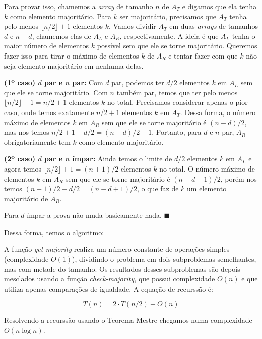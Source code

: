 \documentclass[12pt, a4paper]{article}
\begin{document}
Para provar isso, chamemos a \textit{array} de tamanho $n$ de $A_T$ e digamos que ela tenha $k$ como elemento majoritário. Para $k$ ser majoritário, precisamos que $A_T$ tenha pelo menos $\lfloor n/2 \rfloor + 1$ elementos $k$. Vamos dividir $A_T$ em duas \textit{arrays} de tamanhos $d$ e $n-d$, chamemos elas de $A_L$ e $A_R$, respectivamente. A ideia é que $A_L$ tenha o maior número de elementos $k$ possível sem que ele se torne majoritário. Queremos fazer isso para tirar o máximo de elementos $k$ de $A_R$ e tentar fazer com que $k$ não seja elemento majoritário em nenhuma delas.

\textbf{(1º caso) $d$ par e $n$ par:} Com $d$ par, podemos ter $d/2$ elementos $k$ em $A_L$ sem que ele se torne majoritário. Com $n$ também par, temos que ter pelo menos $\lfloor n/2 \rfloor + 1 = n/2 + 1$ elementos $k$ no total. Precisamos considerar apenas o pior caso, onde temos exatamente $n/2 + 1$ elementos $k$ em $A_T$. Dessa forma, o número máximo de elementos $k$ em $A_R$ sem que ele se torne majoritário é $(n-d)/2$, mas nos temos $n/2 + 1 - d/2=(n-d)/2 + 1$. Portanto, para $d$ e $n$ par, $A_R$ obrigatoriamente tem $k$ como elemento majoritário.

\textbf{(2º caso) $d$ par e $n$ ímpar:} Ainda temos o limite de $d/2$ elementos $k$ em $A_L$ e agora temos $\lfloor n/2 \rfloor + 1 = (n+1)/2$ elementos $k$ no total. O número máximo de elementos $k$ em $A_R$ sem que ele se torne majoritário é $(n-d-1)/2$, porém nos temos $(n+1)/2 - d/2 = (n-d+1)/2$, o que faz de $k$ um elemento majoritário de $A_R$.

Para $d$ ímpar a prova não muda basicamente nada. $\blacksquare$

Dessa forma, temos o algoritmo:



A função \textit{get-majority} realiza um número constante de operações simples (complexidade $O(1)$), dividindo o problema em dois subproblemas semelhantes, mas com metade do tamanho. Os resultados desses subproblemas são depois mesclados usando a função \textit{check-majority}, que possui complexidade $O(n)$ e que utiliza apenas comparações de igualdade. A equação de recurssão é:

\[ T(n) = 2 \cdot T(n/2) + O(n) \]

Resolvendo a recurssão usando o Teorema Mestre chegamos numa complexidade $O(n\log{n})$.
\end{document}
